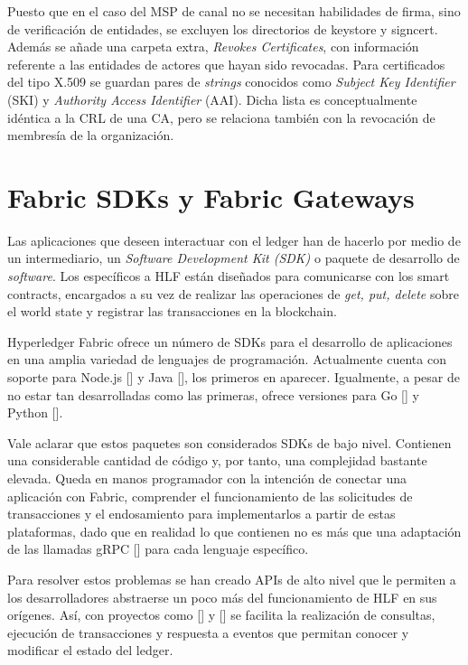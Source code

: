 Puesto que en el caso del MSP de canal no se necesitan habilidades de firma, sino de verificaci\'on de entidades, se excluyen los directorios de keystore y signcert. Adem\'as se a\~nade una carpeta extra, \emph{Revokes Certificates}, con informaci\'on referente a las entidades de actores que hayan sido revocadas. Para certificados del tipo X.509 se guardan pares de \emph{strings} conocidos como \emph{Subject Key Identifier} (SKI) y \emph{Authority Access Identifier} (AAI). Dicha lista es conceptualmente id\'entica a la CRL de una CA, pero se relaciona tambi\'en con la revocaci\'on de membres\'ia de la organizaci\'on.


\section{Fabric SDKs y Fabric Gateways} 

Las aplicaciones que deseen interactuar con el ledger han de hacerlo por medio de un intermediario, un \emph{Software Development Kit (SDK)} o paquete de desarrollo de \emph{software}. Los espec\'ificos a HLF est\'an dise\~nados para comunicarse con los smart contracts, encargados a su vez de realizar las operaciones de \emph{get, put, delete} sobre el world state y registrar las transacciones en la blockchain.%

Hyperledger Fabric ofrece un n\'umero de SDKs para el desarrollo de aplicaciones en una amplia variedad de lenguajes de programaci\'on. Actualmente cuenta con soporte para Node.js [\cite{sdknode}] y Java [\cite{sdkjava}], los primeros en aparecer. Igualmente, a pesar de no estar tan desarrolladas como las primeras, ofrece versiones para Go [\cite{sdkgo}] y Python [\cite{sdkpython}].

Vale aclarar que estos paquetes son considerados SDKs de bajo nivel. Contienen una considerable cantidad de c\'odigo y, por tanto, una complejidad bastante elevada. Queda en manos programador con la intenci\'on de conectar una aplicaci\'on con Fabric, comprender el funcionamiento de las solicitudes de transacciones y el endosamiento para implementarlos a partir de estas plataformas, dado que en realidad lo que contienen no es m\'as que una adaptaci\'on de las llamadas gRPC [\cite{grpc}] para cada lenguaje espec\'ifico.

Para resolver estos problemas se han creado APIs de alto nivel que le permiten a los desarrolladores abstraerse un poco m\'as del funcionamiento de HLF en sus or\'igenes. As\'i, con proyectos como [\cite{fabricgateway}] y [\cite{fabricgatewayjava}] se facilita la realizaci\'on de consultas, ejecuci\'on de transacciones y respuesta a eventos que permitan conocer y modificar el estado del ledger.

